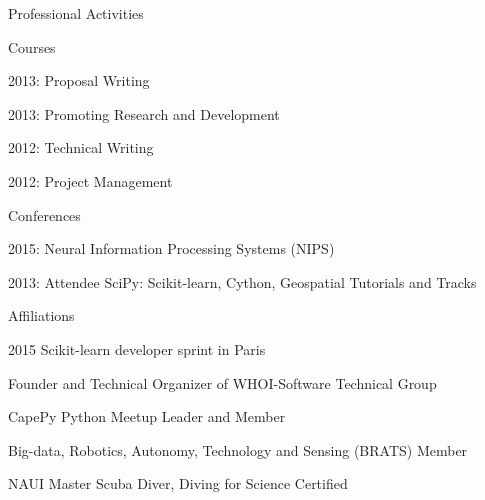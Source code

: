 \documentclass{resume} %
\begin{document}
\begin{rSection}{Professional Activities}
\begin{rSubsection}{Courses}{}{}{}
\item{2013: Proposal Writing}
\item{2013: Promoting Research and Development}
\item{2012: Technical Writing}
\item{2012: Project Management}
\end{rSubsection}

\begin{rSubsection}{Conferences}{}{}{}
\item{2015: Neural Information Processing Systems (NIPS)}
\item{2013: Attendee SciPy: Scikit-learn, Cython, Geospatial Tutorials and Tracks}
\end{rSubsection}


\begin{rSubsection}{Affiliations}{}{}{}{}
\item{2015 Scikit-learn developer sprint in Paris}
\item{Founder and Technical Organizer of WHOI-Software Technical Group}
\item{CapePy Python Meetup Leader and Member}
\item{Big-data, Robotics, Autonomy, Technology and Sensing (BRATS) Member}
\item{NAUI Master Scuba Diver, Diving for Science Certified}
\end{rSubsection}
\end{rSection}
\end{document}
